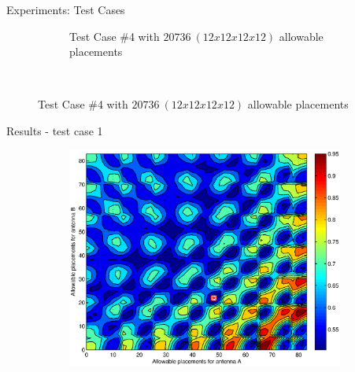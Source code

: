 \documentclass{beamer}
\begin{document}
\begin{frame}{Experiments: Test Cases}
\begin{figure}
\begin{subfigure}{.5\columnwidth}
            \caption*{\tiny Test Case \#4 with $20736~(12x12x12x12)$ allowable placements}%
        \end{subfigure}\hfill\\%
    \end{figure}
\end{frame}

\begin{frame}{Results - test case 1}
    \begin{figure}
        \centering
        \begin{subfigure}{.5\columnwidth}
            \includegraphics[width=\columnwidth,height=\columnwidth]{../paper/FIG/tc1_contour}%
        \end{subfigure}\hfill%
        \begin{subfigure}{.5\columnwidth}

\end{subfigure}
\end{figure}
\end{frame}
\end{document}
